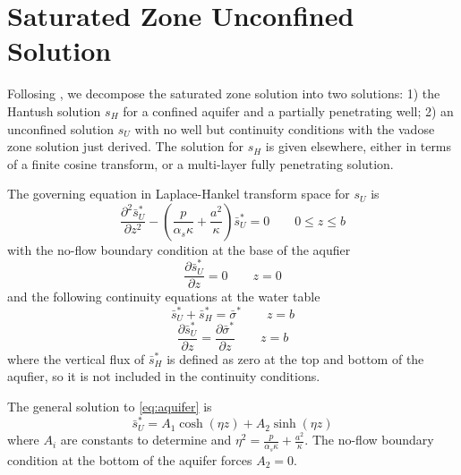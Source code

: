 \documentclass{article}
\begin{document}
\section{Saturated Zone Unconfined Solution}
Follosing \cite{mishra10}, we decompose the saturated zone solution into two solutions: 1) the Hantush solution $s_H$ for a confined aquifer and a partially penetrating well; 2) an unconfined solution $s_U$ with no well but continuity conditions with the vadose zone solution just derived.  The solution for $s_H$ is given elsewhere, either in terms of a finite cosine transform, or a multi-layer fully penetrating solution.  

The governing equation  in Laplace-Hankel transform space for $s_U$ is
\begin{equation}
  \label{eq:aquifer}
  \frac{\partial^2 \bar{s}_U^{\ast}}{\partial z^2} - \left( \frac{p}{\alpha_s \kappa} + \frac{a^2}{\kappa} \right)\bar{s}_U^{\ast} = 0 \qquad 0 \le z \le b
\end{equation}
with the no-flow boundary condition at the base of the aqufier
$$ \frac{\partial \bar{s}_U^{\ast}}{\partial z} = 0 \qquad z=0 $$
and the following continuity equations at the water table 
$$ \bar{s}_U^{\ast} + \bar{s}_H^{\ast} = \bar{\sigma}^{\ast} \qquad z=b$$
$$ \frac{\partial \bar{s}_U^{\ast}}{\partial z}  = \frac{\partial \bar{\sigma}^{\ast}}{\partial z} \qquad z=b $$
where the vertical flux of $\bar{s}_H^{\ast}$ is defined as zero at the top and bottom of the aqufier, so it is not included in the continuity conditions.

The general solution to \eqref{eq:aquifer} is 
\begin{equation}
  \label{eq:su}
  \bar{s}_U^{\ast} = A_1 \cosh(\eta z) + A_2 \sinh(\eta z)
\end{equation}
where $A_i$ are constants to determine and $\eta^2 = \frac{p}{\alpha_s \kappa} + \frac{a^2}{\kappa}$.  The no-flow boundary condition at the bottom of the aquifer forces $A_2=0$.  
\end{document}
